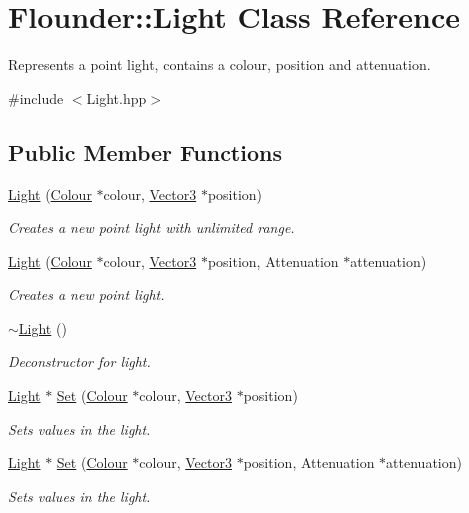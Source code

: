 \hypertarget{class_flounder_1_1_light}{}\section{Flounder\+:\+:Light Class Reference}
\label{class_flounder_1_1_light}


Represents a point light, contains a colour, position and attenuation.  




{\ttfamily \#include $<$Light.\+hpp$>$}

\subsection*{Public Member Functions}
\begin{DoxyCompactItemize}
\item 
\hyperlink{class_flounder_1_1_light_a264f87572b1a08c6055d053ca1ec7723}{Light} (\hyperlink{class_flounder_1_1_colour}{Colour} $\ast$colour, \hyperlink{class_flounder_1_1_vector3}{Vector3} $\ast$position)
\begin{DoxyCompactList}\small\item\em Creates a new point light with unlimited range. \end{DoxyCompactList}\item 
\hyperlink{class_flounder_1_1_light_ac6bd2a20a175f0f8b8dc1e2c8b00e18a}{Light} (\hyperlink{class_flounder_1_1_colour}{Colour} $\ast$colour, \hyperlink{class_flounder_1_1_vector3}{Vector3} $\ast$position, Attenuation $\ast$attenuation)
\begin{DoxyCompactList}\small\item\em Creates a new point light. \end{DoxyCompactList}\item 
\hyperlink{class_flounder_1_1_light_af5f31321c75867eae4bbadab9e4316b0}{$\sim$\+Light} ()
\begin{DoxyCompactList}\small\item\em Deconstructor for light. \end{DoxyCompactList}\item 
\hyperlink{class_flounder_1_1_light}{Light} $\ast$ \hyperlink{class_flounder_1_1_light_ab1d4b3068b9185e6b539d9f824bf042b}{Set} (\hyperlink{class_flounder_1_1_colour}{Colour} $\ast$colour, \hyperlink{class_flounder_1_1_vector3}{Vector3} $\ast$position)
\begin{DoxyCompactList}\small\item\em Sets values in the light. \end{DoxyCompactList}\item 
\hyperlink{class_flounder_1_1_light}{Light} $\ast$ \hyperlink{class_flounder_1_1_light_afc1694efa60f859c03dc9e0996b9dc70}{Set} (\hyperlink{class_flounder_1_1_colour}{Colour} $\ast$colour, \hyperlink{class_flounder_1_1_vector3}{Vector3} $\ast$position, Attenuation $\ast$attenuation)
\begin{DoxyCompactList}\small\item\em Sets values in the light. \end{DoxyCompactList}\end{DoxyCompactItemize}
